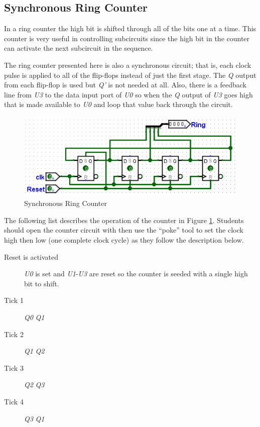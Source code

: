 \subsection{Synchronous Ring Counter}

In a ring counter the high bit is shifted through all of the bits one at a time. This counter is very useful in controlling subcircuits since the high bit in the counter can activate the next subcircuit in the sequence.

The ring counter presented here is also a synchronous circuit; that is, each clock pulse is applied to all of the flip-flops instead of just the first stage. The \textit{Q} output from each flip-flop is used but \textit{Q'} is not needed at all. Also, there is a feedback line from \textit{U3} to the data input port of \textit{U0} so when the \textit{Q} output of \textit{U3} goes high that is made available to \textit{U0} and loop that value back through the circuit.

\begin{figure}[H]
	\centering
	\includegraphics[width=\maxwidth{.95\linewidth}]{gfx/06-04}
	\caption{Synchronous Ring Counter}
	\label{fig:06-04}
\end{figure}

The following list describes the operation of the counter in Figure \ref{fig:06-04}. Students should open the counter circuit with \LE then use the ``poke'' tool to set the clock high then low (one complete clock cycle) as they follow the description below.

\begin{description}
	\item [Reset is activated] \textit{U0} is set and \textit{U1}-\textit{U3} are reset so the counter is seeded with a single high bit to shift.
	
	\item [Tick 1] \textit{Q0} \textdownarrow \: \textemdash \: \textit{Q1} \textuparrow
	
	\item [Tick 2] \textit{Q1} \textdownarrow \: \textemdash \: \textit{Q2} \textuparrow
	
	\item [Tick 3] \textit{Q2} \textdownarrow \: \textemdash \: \textit{Q3} \textuparrow
	
	\item [Tick 4] \textit{Q3} \textdownarrow \: \textemdash \: \textit{Q1} \textuparrow
	
\end{description}

